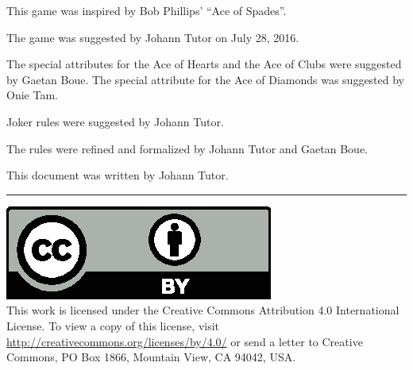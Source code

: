 \documentclass{article}
\begin{document}
This game was inspired by Bob Phillips' ``Ace of Spades''.

The game was suggested by Johann Tutor on July 28, 2016.

The special attributes for the Ace of Hearts and the Ace of Clubs were
suggested by Gaetan Boue. The special attribute for the Ace of Diamonds
was suggested by Onie Tam.

Joker rules were suggested by Johann Tutor.

The rules were refined and formalized by Johann Tutor and Gaetan Boue.

This document was written by Johann Tutor.

\medskip
\hrule

{
  \small
  \includegraphics[scale=0.5]{cc-by.eps}\\
  This work is licensed under the Creative Commons Attribution 4.0
  International License. To view a copy of this license, visit
  \url{http://creativecommons.org/licenses/by/4.0/} or send a letter to Creative Commons, PO Box 1866, Mountain View, CA 94042, USA.
}
\end{document}
